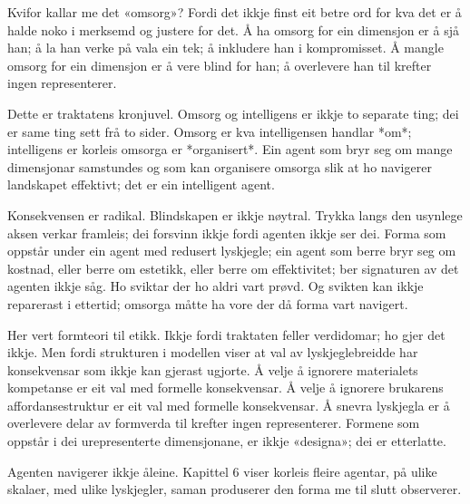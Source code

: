 Kvifor kallar me det «omsorg»? Fordi det ikkje finst eit betre ord for kva det er å halde noko i merksemd og justere for det. Å ha omsorg for ein dimensjon er å sjå han; å la han verke på vala ein tek; å inkludere han i kompromisset. Å mangle omsorg for ein dimensjon er å vere blind for han; å overlevere han til krefter ingen representerer.



Dette er traktatens kronjuvel. Omsorg og intelligens er ikkje to separate ting; dei er same ting sett frå to sider. Omsorg er kva intelligensen handlar *om*; intelligens er korleis omsorga er *organisert*. Ein agent som bryr seg om mange dimensjonar samstundes og som kan organisere omsorga slik at ho navigerer landskapet effektivt; det er ein intelligent agent.

Konsekvensen er radikal. Blindskapen er ikkje nøytral. Trykka langs den usynlege aksen verkar framleis; dei forsvinn ikkje fordi agenten ikkje ser dei. Forma som oppstår under ein agent med redusert lyskjegle; ein agent som berre bryr seg om kostnad, eller berre om estetikk, eller berre om effektivitet; ber signaturen av det agenten ikkje såg. Ho sviktar der ho aldri vart prøvd. Og svikten kan ikkje reparerast i ettertid; omsorga måtte ha vore der då forma vart navigert.


Her vert formteori til etikk. Ikkje fordi traktaten feller verdidomar; ho gjer det ikkje. Men fordi strukturen i modellen viser at val av lyskjeglebreidde har konsekvensar som ikkje kan gjerast ugjorte. Å velje å ignorere materialets kompetanse er eit val med formelle konsekvensar. Å velje å ignorere brukarens affordansestruktur er eit val med formelle konsekvensar. Å snevra lyskjegla er å overlevere delar av formverda til krefter ingen representerer. Formene som oppstår i dei urepresenterte dimensjonane, er ikkje «designa»; dei er etterlatte.

\begin{overgang}
Agenten navigerer ikkje åleine. Kapittel 6 viser korleis fleire agentar, på ulike skalaer, med ulike lyskjegler, saman produserer den forma me til slutt observerer.
\end{overgang}
